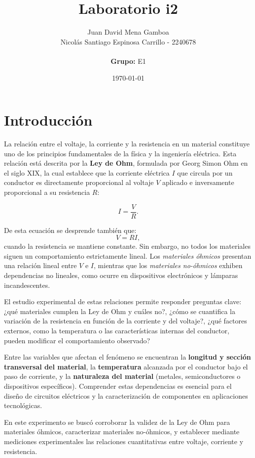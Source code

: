 \documentclass[11pt,twocolumn]{article}
\title{\textbf{Laboratorio i2}}
\author{%
  Juan David Mena Gamboa\\
  Nicolás Santiago Espinosa Carrillo - 2240678 \\
                      \\
  \textbf{Grupo:} E1
}
\date{\today}
\begin{document}
\maketitle
\thispagestyle{fancy}

\section{Introducción}

La relación entre el voltaje, la corriente y la resistencia en un material constituye uno de los principios fundamentales de la física y la ingeniería eléctrica. Esta relación está descrita por la \textbf{Ley de Ohm}, formulada por Georg Simon Ohm en el siglo XIX, la cual establece que la corriente eléctrica $I$ que circula por un conductor es directamente proporcional al voltaje $V$ aplicado e inversamente proporcional a su resistencia $R$:

\begin{equation}
I = \frac{V}{R}.
\end{equation}

De esta ecuación se desprende también que:
\begin{equation}
V = RI,
\end{equation}
cuando la resistencia se mantiene constante. Sin embargo, no todos los materiales siguen un comportamiento estrictamente lineal. Los \textit{materiales óhmicos} presentan una relación lineal entre $V$ e $I$, mientras que los \textit{materiales no-óhmicos} exhiben dependencias no lineales, como ocurre en dispositivos electrónicos y lámparas incandescentes.  

El estudio experimental de estas relaciones permite responder preguntas clave: ¿qué materiales cumplen la Ley de Ohm y cuáles no?, ¿cómo se cuantifica la variación de la resistencia en función de la corriente y del voltaje?, ¿qué factores externos, como la temperatura o las características internas del conductor, pueden modificar el comportamiento observado?  

Entre las variables que afectan el fenómeno se encuentran la \textbf{longitud y sección transversal del material}, la \textbf{temperatura} alcanzada por el conductor bajo el paso de corriente, y la \textbf{naturaleza del material} (metales, semiconductores o dispositivos específicos). Comprender estas dependencias es esencial para el diseño de circuitos eléctricos y la caracterización de componentes en aplicaciones tecnológicas.  

En este experimento se buscó corroborar la validez de la Ley de Ohm para materiales óhmicos, caracterizar materiales no-óhmicos, y establecer mediante mediciones experimentales las relaciones cuantitativas entre voltaje, corriente y resistencia.
\end{document}
